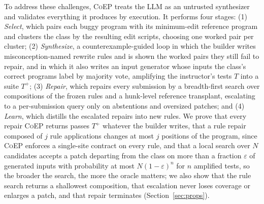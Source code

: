 \documentclass[acmsmall,screen,review,anonymous,nonacm]{acmart}
\newcommand{\tool}{\textsc{CoEP}\xspace}
\begin{document}
To address these challenges, \tool treats the LLM as an untrusted synthesizer and validates everything it produces by execution. It performs four stages: (1) \emph{Select}, which pairs each buggy program with its minimum-edit reference program and clusters the class by the resulting edit scripts, choosing one worked pair per cluster; (2) \emph{Synthesize}, a counterexample-guided loop in which the builder writes misconception-named rewrite rules and is shown the worked pairs they still fail to repair, and in which it also writes an input generator whose inputs the class's correct programs label by majority vote, amplifying the instructor's tests $T$ into a suite $T^{+}$; (3) \emph{Repair}, which repairs every submission by a breadth-first search over compositions of the frozen rules and a hunk-level reference transplant, escalating to a per-submission query only on abstentions and oversized patches; and (4) \emph{Learn}, which distills the escalated repairs into new rules. We prove that every repair \tool returns passes $T^{+}$ whatever the builder writes, that a rule repair composed of $j$ rule applications changes at most $j$ positions of the program, since \tool enforces a single-site contract on every rule, and that a local search over $N$ candidates accepts a patch departing from the class on more than a fraction $\varepsilon$ of generated inputs with probability at most $N(1 - \varepsilon)^{n}$ for $n$ amplified tests, so the broader the search, the more the oracle matters; we also show that the rule search returns a shallowest composition, that escalation never loses coverage or enlarges a patch, and that repair terminates (Section~\ref{sec:props}).
\end{document}

